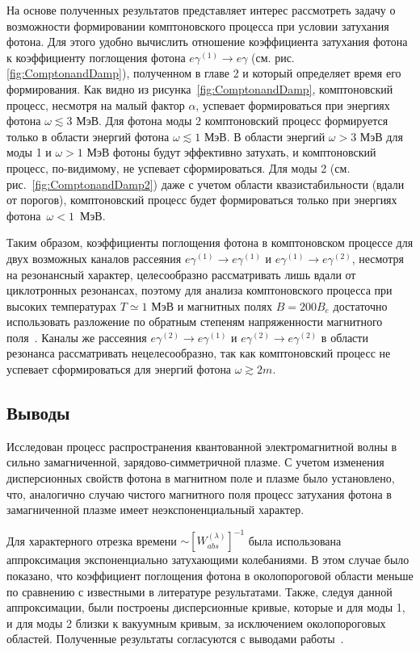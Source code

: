 На основе полученных результатов представляет интерес рассмотреть задачу о возможности формировании комптоновского процесса при условии затухания фотона. Для этого удобно вычислить отношение коэффициента затухания фотона к коэффициенту поглощения фотона $e\gamma^{(1)}\to e\gamma$  (см. рис. \ref{fig:ComptonandDamp}), полученном в главе 2 и который определяет время его формирования. Как видно из рисунка~\ref{fig:ComptonandDamp}, комптоновский процесс, несмотря на малый фактор $\alpha$, успевает формироваться при энергиях фотона $\omega\lesssim3$ МэВ. Для фотона моды 2 комптоновский процесс формируется только в области энергий фотона $\omega\lesssim1$ МэВ. В области энергий $\omega>3$ МэВ для моды 1 и $\omega>1$ МэВ фотоны будут эффективно затухать, и комптоновский процесс, по-видимому, не успевает сформироваться. Для моды 2 (см. рис.~\ref{fig:ComptonandDamp2}) даже с учетом области квазистабильности (вдали от порогов), комптоновский процесс будет формироваться только при энергиях фотона~$\omega<1$~МэВ.

Таким образом, коэффициенты поглощения фотона в комптоновском процессе для двух возможных каналов рассеяния $e\gamma^{(1)}  \to e\gamma^{(1)}$ и $e\gamma^{(1)}  \to e\gamma^{(2)}$, несмотря на резонансный характер, целесообразно рассматривать лишь вдали от циклотронных резонансах, поэтому для анализа комптоновского процесса при высоких температурах $T\simeq 1$ МэВ и магнитных полях $B=200 B_e$ достаточно использовать разложение по обратным степеням напряженности магнитного поля~\cite{Chistyakov:2009}. Каналы же рассеяния $e\gamma^{(2)}  \to e\gamma^{(1)}$  и $e\gamma^{(2)}  \to e\gamma^{(2)}$ в области резонанса рассматривать нецелесообразно, так как комптоновский процесс не успевает сформироваться для энергий фотона $\omega\gtrsim 2m$.

\subsection{Выводы}
Исследован процесс распространения квантованной электромагнитной волны в сильно замагниченной, зарядово-симметричной плазме. С учетом изменения дисперсионных свойств фотона в магнитном поле и плазме было установлено, что, аналогично случаю чистого магнитного поля процесс затухания фотона
в замагниченной плазме имеет неэкспоненциальный характер. 

Для характерного отрезка времени $\sim [W^{{(\lambda)}}_{abs}]^{-1}$ была использована аппроксимация экспоненциально затухающими колебаниями. В этом случае было
показано, что коэффициент поглощения фотона в околопороговой области меньше по сравнению с известными в литературе результатами. Также, следуя данной аппроксимации, были построены дисперсионные кривые, которые и для моды 1, и для моды 2 близки к вакуумным кривым, за исключением околопороговых областей. Полученные результаты согласуются с выводами работы~\cite{Shabad:1988}.

